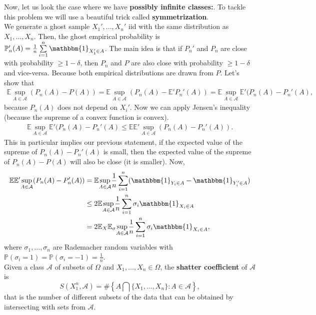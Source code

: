 \documentclass[11pt, english]{article}
\begin{document}
Now, let us look the case where we have \textbf{possibly infinite classes:}. To tackle this problem we will use a beautiful trick called \textbf{symmetrization}.\\
We generate a ghost sample $X_1',\dots,X_n'$ iid with the same distribution as $X_1,\dots,X_n$. Then, the ghost empirical probability is $\mathbb{P}_n'(A)=\frac{1}{n}\sum\limits_{i=1}^n\mathbbm{1}_{X_1'\in A}$. The main idea is that if $P_n'$ and $P_n$ are close with probability $\geq 1-\delta$, then $P_n$ and $P$ are also close with probability $\geq 1-\delta$ and vice-versa. Because both empirical distributions are drawn from $P$. Let's show that
\begin{align}
	\mathbb{E}\underset{A\in\mathcal{A}}{\sup}(P_n(A)-P(A))=\mathbb{E}\underset{A\in\mathcal{A}}{\sup}(P_n(A)-\mathbb{E}'P_n'(A))=\mathbb{E}\underset{A\in\mathcal{A}}{\sup}\mathbb{E}'(P_n(A)-P_n'(A),
\end{align}
because $P_n(A)$ does not depend on $X_i'$. Now we can apply Jensen's inequality (because the supreme of a convex function is convex).
\begin{align}
	\mathbb{E}\underset{A\in\mathcal{A}}{\sup}\mathbb{E}'(P_n(A)-P_n'(A)\leq \mathbb{E}\mathbb{E}'\underset{A\in\mathcal{A}}{\sup}(P_n(A)-P_n'(A)).
\end{align}
 This in particular implies our previous statement, if the expected value of the supreme of $P_n(A)-P_n'(A)$ is small, then the expected value of the supreme of $P_n(A)-P(A)$ will also be close (it is smaller). Now,
 \begin{align}
 	\mathbb{E}\mathbb{E}'\underset{A\in\mathcal{A}}{\sup}(P_n(A)-P_n'(A))&=\mathbb{E}\underset{A\in\mathcal{A}}{\sup}\frac{1}{n}\sum\limits_{i=1}^n(\mathbbm{1}_{Y_i\in A}-\mathbbm{1}_{Y_i'\in A})\\
 	&\leq 2\mathbb{E}\underset{A\in\mathcal{A}}{\sup}\frac{1}{n}\sum\limits_{i=1}^n\sigma_i\mathbbm{1}_{X_i\in A}\\
 	&=2\mathbb{E}_X\mathbb{E}_{\sigma}\underset{A\in\mathcal{A}}{\sup}\frac{1}{n}\sum\limits_{i=1}^n\sigma_i\mathbbm{1}_{X_i\in A},
 \end{align}
 where $\sigma_1,\dots,\sigma_n$ are Rademacher random variables with $\mathbb{P}(\sigma_i=1)=\mathbb{P}(\sigma_i=-1)=\frac{1}{n}$.\\
 
 Given a class $\mathcal{A}$ of subsets of $\Omega$ and $X_1,\dots,X_n\in \Omega$, the \textbf{shatter coefficient} of $\mathcal{A}$ is 
 \begin{equation}
 	S(X_1^n,\mathcal{A})=\#\left\{A\bigcap\{X_1,\dots,X_n\}:A\in\mathcal{A}\right\},
 \end{equation}
 that is the number of different subsets of the data that can be obtained by intersecting with sets from $\mathcal{A}$.\\
 
\end{document}
